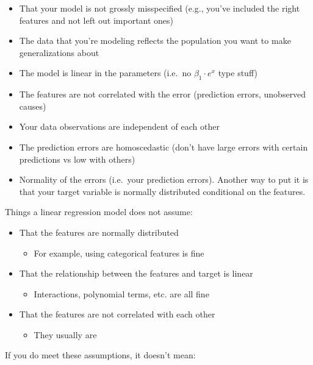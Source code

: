 \documentclass[
  letterpaper,
]{krantz}
\providecommand{\tightlist}{%
  \setlength{\itemsep}{0pt}\setlength{\parskip}{0pt}}\usepackage{longtable,booktabs,array}
\begin{document}
\begin{itemize}
\tightlist
\item
  That your model is not grossly misspecified (e.g., you've included the
  right features and not left out important ones)
\item
  The data that you're modeling reflects the population you want to make
  generalizations about
\item
  The model is linear in the parameters (i.e.~no \(\beta_1\cdot e^x\)
  type stuff)
\item
  The features are not correlated with the error (prediction errors,
  unobserved causes)
\item
  Your data observations are independent of each other
\item
  The prediction errors are homoscedastic (don't have large errors with
  certain predictions vs low with others)
\item
  Normality of the errors (i.e.~your prediction errors). Another way to
  put it is that your target variable is normally distributed
  conditional on the features.
\end{itemize}

Things a linear regression model does not assume:

\begin{itemize}
\tightlist
\item
  That the features are normally distributed

  \begin{itemize}
  \tightlist
  \item
    For example, using categorical features is fine
  \end{itemize}
\item
  That the relationship between the features and target is linear

  \begin{itemize}
  \tightlist
  \item
    Interactions, polynomial terms, etc. are all fine
  \end{itemize}
\item
  That the features are not correlated with each other

  \begin{itemize}
  \tightlist
  \item
    They usually are
  \end{itemize}
\end{itemize}

If you do meet these assumptions, it doesn't mean:
\end{document}
